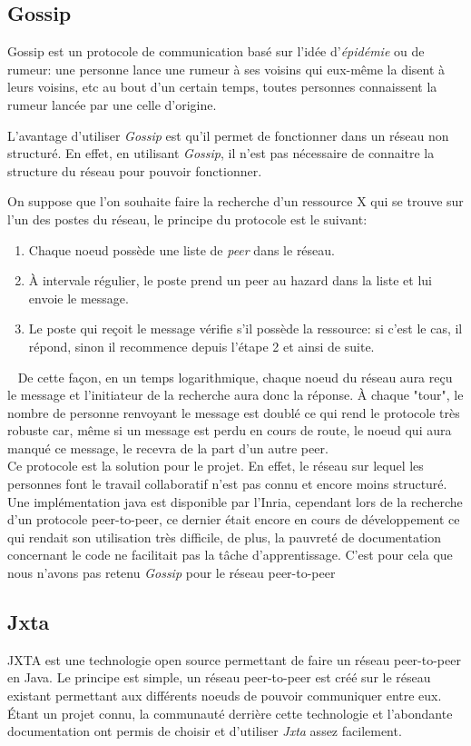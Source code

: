 	\subsection{Gossip}
	
		Gossip est un protocole de communication basé sur l'idée
		d'\emph{épidémie} ou de rumeur: une personne lance une rumeur à ses
		voisins qui eux-même la disent à leurs voisins, etc au bout d'un certain
		temps, toutes personnes connaissent la rumeur lancée par une celle
		d'origine.
		
		L'avantage d'utiliser \emph{Gossip} est qu'il permet de fonctionner dans
		un réseau non structuré. En effet, en utilisant \emph{Gossip}, il n'est
		pas nécessaire de connaitre la structure du réseau pour pouvoir
		fonctionner.
		
		On suppose que l'on souhaite faire la recherche d'un ressource X qui se
		trouve sur l'un des postes du réseau, le principe du protocole est le
		suivant:
		\begin{enumerate}
			\item Chaque noeud possède une liste de \emph{peer} dans le réseau.
			\item À intervale régulier, le poste prend un peer au hazard dans la
			liste et lui envoie le message.
			\item Le poste qui reçoit le message vérifie s'il possède la
			ressource: si c'est le cas, il répond, sinon il recommence depuis
			l'étape 2 et ainsi de suite.
		\end{enumerate}~
		De cette façon, en un temps logarithmique, chaque noeud du réseau aura
		reçu le message et l'initiateur de la recherche aura donc la réponse. À
		chaque "tour", le nombre de personne renvoyant le message est doublé ce
		qui rend le protocole très robuste car, même si un message est perdu en
		cours de route, le noeud qui aura manqué ce message, le recevra de la
		part d'un autre peer.\\
		
		Ce protocole est la solution pour le projet. En effet, le réseau sur
		lequel les personnes font le travail collaboratif n'est pas connu et
		encore moins structuré. Une implémentation java est disponible par
		l'Inria, cependant lors de la recherche d'un protocole peer-to-peer, ce
		dernier était encore en cours de développement ce qui rendait son
		utilisation très difficile, de plus, la pauvreté de documentation
		concernant le code ne facilitait pas la tâche d'apprentissage. C'est
		pour cela que nous n'avons pas retenu \emph{Gossip} pour le réseau
		peer-to-peer
	
	\subsection{Jxta}
		JXTA est une technologie open source permettant de faire un réseau
		peer-to-peer en Java. Le principe est simple, un réseau peer-to-peer est
		créé sur le réseau existant permettant aux différents noeuds de pouvoir
		communiquer entre eux.\\
		
		Étant un projet connu, la communauté derrière cette technologie et
		l'abondante documentation ont permis de choisir et d'utiliser
		\emph{Jxta} assez facilement.